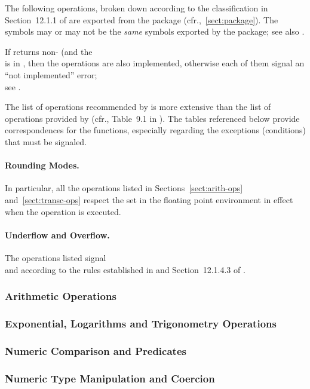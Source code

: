 \documentclass[../Floating-Point-Operations.tex]{subfiles}
\begin{document}
The following \CL{} operations, broken down according to the
classification in Section~12.1.1 of \cite{1996:ANSIHyperSpec} are exported
from the \CLLIAPKG{} package
(cfr.,~\ref{sect:package}).  The symbols may or may not be the 
\emph{same} symbols exported by the  package; 
see also .


If  returns non-
(and the\\
 is in
, then the operations are also implemented, otherwise
each of them signal an ``not implemented'' error;\\
see .

The list of operations
recommended by \cite{2008:IEEE-754} is more extensive than the list of
operations provided by \CL{} (cfr., Table~9.1 in \cite{2008:IEEE-754}).
%
The tables referenced below provide correspondences for the \CL{} functions,
especially regarding the exceptions (conditions) that must be
signaled.

\paragraph{Rounding Modes.} In particular, all the operations listed
in Sections~\ref{sect:arith-ops} and~\ref{sect:transc-ops} respect the
 set in the floating point
environment in effect when the operation is executed.

\paragraph{Underflow and Overflow.}  The operations listed signal
\\ and
 according to the rules established
in \cite{2008:IEEE-754} and Section~12.1.4.3 of \cite{1996:ANSIHyperSpec}.


\subsubsection{Arithmetic Operations}

\newpage

\subsubsection{Exponential, Logarithms and Trigonometry Operations}

\newpage

\subsubsection{Numeric Comparison and Predicates}


\subsubsection{Numeric Type Manipulation and Coercion}

\end{document}
